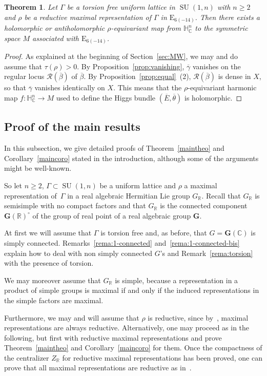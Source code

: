 \documentclass[10pt]{amsart}
\let\mathcal\mathscr
\newcommand{\citestar}[3]{\cite[#3]{#1}}
\theoremstyle{plain}
\newtheorem{theo}{Theorem}[section]
\theoremstyle{definition}
\let\ov\overline
\DeclareMathOperator{\SU}{SU}
\newcommand{\cR}{\mathcal{R}}
\newcommand{\bC}{\mathbb{C}}
\newcommand{\bH}{\mathbb{H}}
\newcommand{\bR}{\mathbb{R}}
\newcommand{\HC}{{\mathbb{H}^n_\mathbb{C}}}
\newcommand{\bfG}{\boldsymbol{G}}
\newcommand{\ovE}{\ov{E}}
\newcommand{\ovb}{\ov{\beta}}
\newcommand{\ovg}{\ov{\gamma}}
\newcommand{\ovt}{\ov{\theta}}
\begin{document}
\begin{theo}\label{thm:E6}
Let $\Gamma$ be a torsion free uniform lattice in $\SU(1,n)$ with $n\geq 2$ and $\rho$ be a reductive maximal representation of
$\Gamma$ in $\mathrm{E}_{6(-14)}$. Then there exists a holomorphic or antiholomorphic $\rho$-equivariant
map from $\bH^n_\bC$ to the symmetric space $M$
associated with $\mathrm{E}_{6(-14)}$.
\end{theo}

\begin{proof}
As explained at the beginning of Section~\ref{sec:MW}, we may and do assume that
$\tau(\rho)>0$.
By Proposition~\ref{prop:vanishing}, $\ovg$ vanishes on the regular locus ${\cR}(\ovb)$ of $\ovb$. By
Proposition~\ref{prop:equal}~(2), ${\cR}(\ovb)$ is dense in $X$, so that $\ovg$ vanishes
identically on $X$. This means that the $\rho$-equivariant harmonic map $f:\HC\to M$ used to
define the Higgs bundle $(\ovE,\ovt)$ is holomorphic.
\end{proof}

\subsection{Proof of the main results}
\label{subsec:proof}

In this subsection, we give detailed proofs of Theorem~\ref{maintheo} and Corollary~\ref{maincoro}
stated in the introduction,
although some of the arguments might be well-known.

So let $n\geq 2$, $\Gamma\subset\SU(1,n)$ be a uniform lattice and $\rho$ a maximal
representation of~$\Gamma$ in a real algebraic Hermitian Lie group $G_\bR$.
Recall that $G_\bR$ is semisimple
with no compact factors and that $G_\bR$ is the connected component
$\bfG(\bR)^\circ$ of the group of real point of a real algebraic group $\bfG$.

At first we will assume that $\Gamma$ is torsion free and, as before, that $G = \bfG(\bC)$ is
simply connected. Remarks~\ref{rema:1-connected} and~\ref{rema:1-connected-bis} explain how to deal
with non simply connected $G$'s and Remark~\ref{rema:torsion} with the presence of torsion.

We may moreover assume that $G_\bR$ is simple,
because a representation in a product of simple groups
is maximal if and only if the induced representations in the simple factors are maximal.

Furthermore, we may and will assume that $\rho$ is
reductive, since by~\citestar{BIW}*{Cor.\,4}, maximal representations are always
reductive. Alternatively, one may proceed as in the following, but first with
reductive maximal representations and prove Theorem~\ref{maintheo} and Corollary~\ref{maincoro} for
them. Once the compactness of the centralizer $Z_\bR$ for reductive maximal representations has been
proved, one can prove that all maximal representations are reductive as
in~\citestar{KM}*{}.
\end{document}
